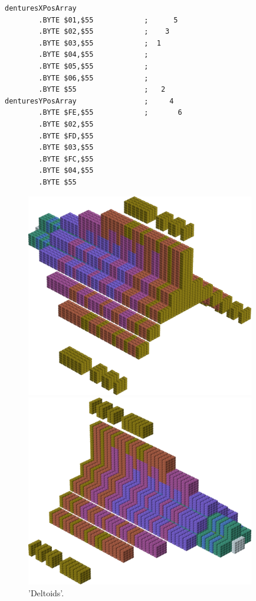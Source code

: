 \begin{minipage}[b]{0.48\linewidth}
\begin{lrbox}{\mybox}%
\begin{lstlisting}[basicstyle=\ttfamily\tiny,escapechar=\%]
denturesXPosArray
        .BYTE $01,$55            ;      5 
        .BYTE $02,$55            ;    3   
        .BYTE $03,$55            ;  1     
        .BYTE $04,$55            ;        
        .BYTE $05,$55            ;        
        .BYTE $06,$55            ;        
        .BYTE $55                ;   2    
denturesYPosArray                ;     4  
        .BYTE $FE,$55            ;       6
        .BYTE $02,$55
        .BYTE $FD,$55
        .BYTE $03,$55
        .BYTE $FC,$55
        .BYTE $04,$55
        .BYTE $55
\end{lstlisting}
\end{lrbox}%
\scalebox{0.8}{\usebox{\mybox}}

\end{minipage}
%
%
\begin{minipage}[b]{0.48\linewidth}
\begin{figure}[H]
    \centering
    \begin{adjustbox}{width=5cm,margin=0cm 0cm}
      \includegraphics[width=10cm]{src/colorspace_patterns/pattern3-45.png}%
    \end{adjustbox}
    \begin{adjustbox}{width=5cm,margin=0cm 0cm}
      \includegraphics[width=10cm]{src/colorspace_patterns/pattern3-225.png}%
    \end{adjustbox}
\caption{'Deltoids'.}
\end{figure}
\end{minipage}

